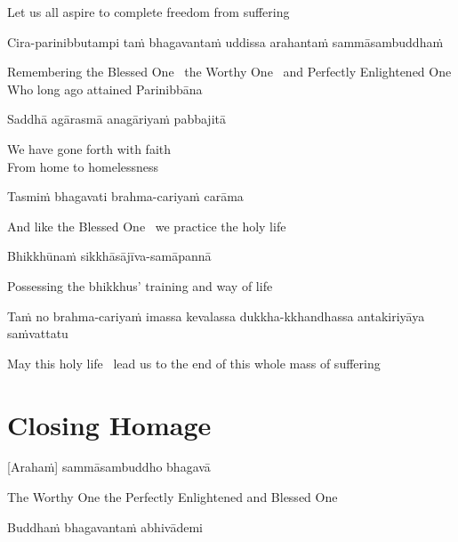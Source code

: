 \begin{cprenglish}
  Let us all aspire to complete freedom from suffering
\end{cprenglish}

Cira-parinibbutampi taṁ bhagavantaṁ uddissa arahantaṁ sammāsambuddhaṁ

\begin{cprenglish}
  Remembering the Blessed One \breathmark\ the Worthy One \breathmark\ and Perfectly Enlightened One\\
  Who long ago attained Parinibbāna
\end{cprenglish}

Saddhā agārasmā anagāriyaṁ pabbajitā

\begin{cprenglish}
  We have gone forth with faith\\
  From home to homelessness
\end{cprenglish}

Tasmiṁ bhagavati brahma-cariyaṁ carāma

\begin{cprenglish}
  And like the Blessed One \breathmark\ we practice the holy life
\end{cprenglish}

Bhikkhūnaṁ sikkhāsājīva-samāpannā

\begin{cprenglish}
  Possessing the bhikkhus’ training and way of life
\end{cprenglish}

Taṁ no brahma-cariyaṁ imassa kevalassa dukkha-kkhandhassa antakiriyāya saṁvattatu

\begin{cprenglish}
  May this holy life \breathmark\ lead us to the end of this whole mass of suffering
\end{cprenglish}

\section{Closing Homage}
\label{closing-homage}

[Arahaṁ] sammāsambuddho bhagavā

\begin{cprenglish}
  The Worthy One the Perfectly Enlightened and Blessed One
\end{cprenglish}

Buddhaṁ bhagavantaṁ abhivādemi

